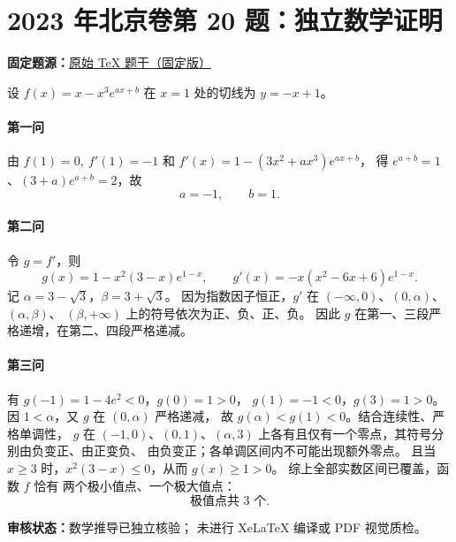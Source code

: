 \documentclass[UTF8,a4paper,11pt]{ctexart}
\begin{document}
\section*{2023 年北京卷第 20 题：独立数学证明}
\noindent\textbf{固定题源：}\href{https://github.com/DxAThing/Gaokao-Math-Problems-Compilation/blob/f1ae169b58a75b3db6e35c670b3f0d5c78718188/content/2023/beijing.tex#L627}{原始 TeX 题干（固定版）}

设 $f(x)=x-x^3e^{ax+b}$ 在 $x=1$ 处的切线为 $y=-x+1$。
\paragraph{第一问}
由 $f(1)=0,\ f'(1)=-1$ 和
$f'(x)=1-(3x^2+ax^3)e^{ax+b}$，
得 $e^{a+b}=1$、$(3+a)e^{a+b}=2$，故
\[\boxed{a=-1,\qquad b=1}.\]
\paragraph{第二问}
令 $g=f'$，则
\[
g(x)=1-x^2(3-x)e^{1-x},\qquad
g'(x)=-x(x^2-6x+6)e^{1-x}.
\]
记 $\alpha=3-\sqrt3$，$\beta=3+\sqrt3$。
因为指数因子恒正，$g'$ 在
$(-\infty,0)$、$(0,\alpha)$、$(\alpha,\beta)$、
$(\beta,+\infty)$ 上的符号依次为正、负、正、负。
因此 $g$ 在第一、三段严格递增，在第二、四段严格递减。

\paragraph{第三问}
有 $g(-1)=1-4e^2<0$，$g(0)=1>0$，
$g(1)=-1<0$，$g(3)=1>0$。
因 $1<\alpha$，又 $g$ 在 $(0,\alpha)$ 严格递减，
故 $g(\alpha)<g(1)<0$。结合连续性、严格单调性，
$g$ 在 $(-1,0)$、$(0,1)$、$(\alpha,3)$
上各有且仅有一个零点，其符号分别由负变正、由正变负、
由负变正；各单调区间内不可能出现额外零点。
且当 $x\ge3$ 时，$x^2(3-x)\le0$，从而 $g(x)\ge1>0$。
综上全部实数区间已覆盖，函数 $f$ 恰有
两个极小值点、一个极大值点：
\[
\boxed{\text{极值点共 }3\text{ 个}}.
\]

\noindent\textbf{审核状态：}数学推导已独立核验；
未进行 XeLaTeX 编译或 PDF 视觉质检。

\clearpage
{}
{}
\end{document}
